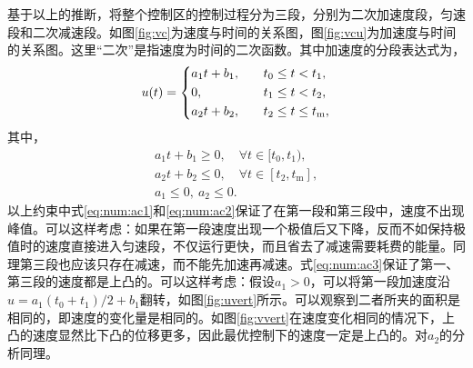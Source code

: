 基于以上的推断，将整个控制区的控制过程分为三段，分别为二次加速度段，匀速段和二次减速段。如图\ref{fig:vc}为速度与时间的关系图，图\ref{fig:vcu}为加速度与时间的关系图。这里“二次”是指速度为时间的二次函数。其中加速度的分段表达式为，
\begin{equation}
u(t)=
\begin{dcases}
a_1t+b_1,\quad& t_0\leq t < t_1,\\
0, \quad& t_1\leq t < t_2,\\
a_2t+b_2,\quad& t_2\leq t\leq t_\mathrm{m},
\end{dcases}
\end{equation}
其中，
\begin{gather}
a_1t+b_1 \geq 0,\quad \forall t\in [t_0,t_1),\label{eq:num:ac1}\\
a_2t+b_2 \leq 0,\quad \forall t\in [t_2,t_\mathrm{m}],\label{eq:num:ac2}\\
a_1\leq 0,\ a_2\leq 0.\label{eq:num:ac3}
\end{gather}
以上约束中式\eqref{eq:num:ac1}和\eqref{eq:num:ac2}保证了在第一段和第三段中，速度不出现峰值。可以这样考虑：如果在第一段速度出现一个极值后又下降，反而不如保持极值时的速度直接进入匀速段，不仅运行更快，而且省去了减速需要耗费的能量。同理第三段也应该只存在减速，而不能先加速再减速。式\eqref{eq:num:ac3}保证了第一、第三段的速度都是上凸的。可以这样考虑：假设$a_1>0$，可以将第一段加速度沿$u=a_1(t_0+t_1)/2+b_1$翻转，如图\ref{fig:uvert}所示。可以观察到二者所夹的面积是相同的，即速度的变化量是相同的。如图\ref{fig:vvert}在速度变化相同的情况下，上凸的速度显然比下凸的位移更多，因此最优控制下的速度一定是上凸的。对$a_2$的分析同理。
